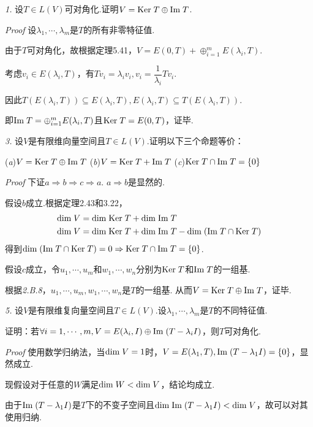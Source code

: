 \textit{1.}
设\(T \in L(V)\)可对角化.证明\(V=\mathrm{Ker \;} T \oplus \mathrm{Im \;} T\).

\textit{Proof}
设\(\lambda_1,\cdots,\lambda_m\)是\(T\)的所有非零特征值.

由于\(T\)可对角化，故根据定理5.41，\(V=E(0,T)+\oplus_{i=1}^m E(\lambda_i,T)\).

考虑\(v_i \in E(\lambda_i,T)\)，有\(Tv_i=\lambda_iv_i,v_i=\dfrac{1}{\lambda_i}Tv_i\).

因此\(T(E(\lambda_i,T)) \subseteq E(\lambda_i,T),E(\lambda_i,T) \subseteq T(E(\lambda_i,T))\).

即\(\mathrm{Im \;} T=\oplus_{i=1}^m E(\lambda_i,T)\)且\(\mathrm{Ker \;} T=E(0,T)\)，证毕.

\hspace*{\fill}

\textit{3.}
设\(V\)是有限维向量空间且\(T \in L(V)\).证明以下三个命题等价：

(\textit{a})\(V=\mathrm{Ker \;} T \oplus \mathrm{Im \;} T\) \quad
(\textit{b})\(V=\mathrm{Ker \;} T+\mathrm{Im \;} T\) \quad
(\textit{c})\(\mathrm{Ker \;} T \cap \mathrm{Im \;} T=\{0\}\)

\textit{Proof}
下证\(a \Rightarrow b \Rightarrow c \Rightarrow a\).
\(a \Rightarrow b\)是显然的.

假设\(b\)成立.根据定理2.43和3.22，
    \begin{align*}
        \mathrm{dim \;} V &= \mathrm{dim \;} \mathrm{Ker \;} T+\mathrm{dim \;} \mathrm{Im \;} T \\
        \mathrm{dim \;} V &= \mathrm{dim \;} \mathrm{Ker \;} T+\mathrm{dim \;} \mathrm{Im \;} T-\mathrm{dim \;} (\mathrm{Im \;} T \cap \mathrm{Ker \;} T)
    \end{align*}
得到\(\mathrm{dim \;} (\mathrm{Im \;} T \cap \mathrm{Ker \;} T)=0 \Rightarrow \mathrm{Ker \;} T \cap \mathrm{Im \;} T=\{0\}\).

假设\(c\)成立，令\(u_1,\cdots,u_m\)和\(w_1,\cdots,w_n\)分别为\(\mathrm{Ker \;} T\)和\(\mathrm{Im \;} T\)的一组基.

根据\textit{2.B.8}，\(u_1,\cdots,u_m,w_1,\cdots,w_n\)是\(T\)的一组基.
从而\(V=\mathrm{Ker \;} T \oplus \mathrm{Im \;} T\)，证毕.

\hspace*{\fill}

\textit{5.}
设\(V\)是有限维复向量空间且\(T \in L(V)\).设\(\lambda_1,\cdots,\lambda_m\)是\(T\)的不同特征值.

证明：若\(\forall i=1,\cdots,m,V=E(\lambda_i,I) \oplus \mathrm{Im \;}(T-\lambda_i I)\)，则\(T\)可对角化.

\textit{Proof}
使用数学归纳法，当\(\mathrm{dim \;} V=1\)时，\(V=E(\lambda_1,T),\mathrm{Im \;}(T-\lambda_1 I)=\{0\}\)，显然成立.

现假设对于任意的\(W\)满足\(\mathrm{dim \;} W<\mathrm{dim \;} V\)，结论均成立.

由于\(\mathrm{Im \;}(T-\lambda_1 I)\)是\(T\)下的不变子空间且\(\mathrm{dim \;} \mathrm{Im \;}(T-\lambda_1 I)<\mathrm{dim \;} V\)，故可以对其使用归纳.

